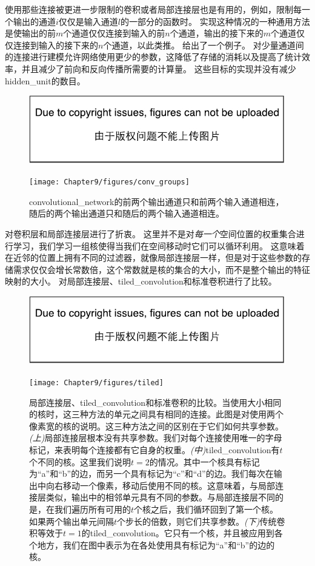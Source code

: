 使用那些连接被更进一步限制的卷积或者局部连接层也是有用的，例如，限制每一个输出的通道$i$仅仅是输入通道$l$的一部分的函数时。
实现这种情况的一种通用方法是使输出的前$m$个通道仅仅连接到输入的前$n$个通道，输出的接下来的$m$个通道仅仅连接到输入的接下来的$n$个通道，以此类推。
给出了一个例子。
对少量通道间的连接进行建模允许网络使用更少的参数，这降低了存储的消耗以及提高了统计效率，并且减少了前向和反向传播所需要的计算量。
这些目标的实现并没有减少\gls{hidden_unit}的数目。
\begin{figure}[!htb]
\ifOpenSource
\centerline{\includegraphics{figure.pdf}}
\else
\centerline{\texttt{[image: Chapter9/figures/conv\_groups]}}
\fi
\caption{\gls{convolutional_network}的前两个输出通道只和前两个输入通道相连，随后的两个输出通道只和随后的两个输入通道相连。}
\label{fig:chap9_conv_groups}
\end{figure}

\citep{Gregor+LeCun-2010,Le2010}对卷积层和局部连接层进行了折衷。
这里并不是对\emph{每一个}空间位置的权重集合进行学习，我们学习一组核使得当我们在空间移动时它们可以循环利用。
这意味着在近邻的位置上拥有不同的过滤器，就像局部连接层一样，但是对于这些参数的存储需求仅仅会增长常数倍，这个常数就是核的集合的大小，而不是整个输出的特征映射的大小。
对局部连接层、\gls{tiled_convolution}和标准卷积进行了比较。
\begin{figure}[!htb]
\ifOpenSource
\centerline{\includegraphics{figure.pdf}}
\else
\centerline{\texttt{[image: Chapter9/figures/tiled]}}
\fi
\captionsetup{singlelinecheck=off}
\caption[.]{局部连接层、\gls{tiled_convolution}和标准卷积的比较。当使用大小相同的核时，这三种方法的单元之间具有相同的连接。此图是对使用两个像素宽的核的说明。这三种方法之间的区别在于它们如何共享参数。\emph{(上)}局部连接层根本没有共享参数。我们对每个连接使用唯一的字母标记，来表明每个连接都有它自身的权重。\emph{(中)}\gls{tiled_convolution}有$t$个不同的核。这里我们说明$t=2$的情况。其中一个核具有标记为``a''和``b''的边，而另一个具有标记为``c''和``d''的边。我们每次在输出中向右移动一个像素，移动后使用不同的核。这意味着，与局部连接层类似，输出中的相邻单元具有不同的参数。与局部连接层不同的是，在我们遍历所有可用的$t$个核之后，我们循环回到了第一个核。如果两个输出单元间隔$t$个步长的倍数，则它们共享参数。\emph{(下)}传统卷积等效于$t=1$的\gls{tiled_convolution}。它只有一个核，并且被应用到各个地方，我们在图中表示为在各处使用具有标记为``a''和``b''的边的核。}
\label{fig:chap9_tiled}
\end{figure}
 
